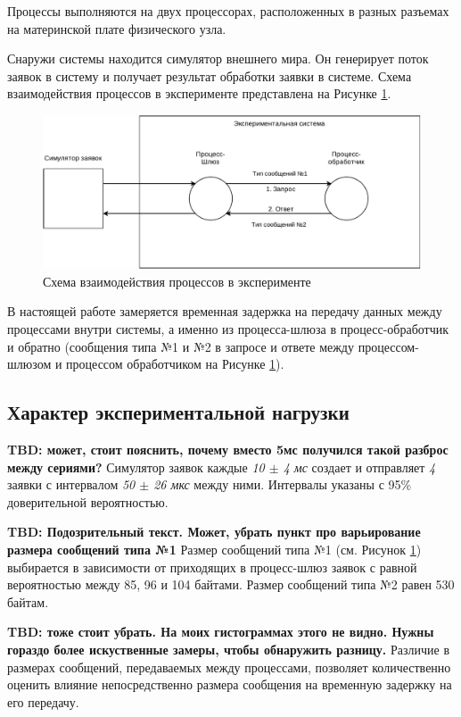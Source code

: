 Процессы выполняются на двух процессорах, расположенных в разных разъемах на материнской плате физического узла.

Снаружи системы находится симулятор внешнего мира. Он генерирует поток заявок в систему и получает результат обработки заявки в системе. Схема взаимодействия процессов в эксперименте представлена на Рисунке \ref{chapter41:SystemSchema}.

\begin{figure}[!h]
\caption{Схема взаимодействия процессов в эксперименте}
\label{chapter41:SystemSchema}
\includegraphics[width=\textwidth]{../../graphics/schemes/SystemSchema}
\end{figure}

В настоящей работе замеряется временная задержка на передачу данных между процессами внутри системы, а именно из процесса-шлюза в процесс-обработчик и обратно (сообщения типа №1 и №2 в запросе и ответе между процессом-шлюзом и процессом обработчиком на Рисунке \ref{chapter41:SystemSchema}).

\subsection{Характер экспериментальной нагрузки}

\textbf{TBD: может, стоит пояснить, почему вместо 5мс получился такой разброс между сериями?}
Симулятор заявок каждые \textit{10 $\pm$ 4 мс} создает и отправляет \textit{4} заявки с интервалом \textit{50 $\pm$ 26 мкс} между ними. Интервалы указаны с 95\% доверительной вероятностью. 

\textbf{TBD: Подозрительный текст. Может, убрать пункт про варьирование размера сообщений типа №1}
Размер сообщений типа №1 (см. Рисунок \ref{chapter41:SystemSchema}) выбирается в зависимости от приходящих в процесс-шлюз заявок с равной вероятностью между 85, 96 и 104 байтами. Размер сообщений типа №2 равен 530 байтам.

\textbf{TBD: тоже стоит убрать. На моих гистограммах этого не видно. Нужны гораздо более искуственные замеры, чтобы обнаружить разницу.}
Различие в размерах сообщений, передаваемых между процессами, позволяет количественно оценить влияние непосредственно размера сообщения на временную задержку на его передачу.

